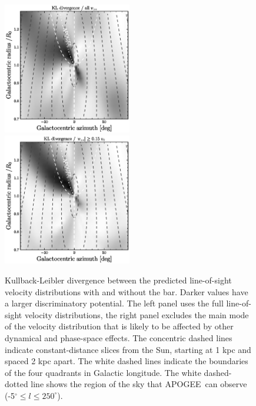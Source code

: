 \documentclass[12pt,preprint]{aastex}
\newcommand{\apogee}{APOGEE}
\begin{document}
\clearpage
\begin{figure}
\includegraphics[width=0.5\textwidth]{detecta.ps}
\includegraphics[width=0.5\textwidth]{detectb.ps}
\caption{Kullback-Leibler divergence between the predicted
  line-of-sight velocity distributions with and without the
  bar. Darker values have a larger discriminatory potential. The left
  panel uses the full line-of-sight velocity distributions, the right
  panel excludes the main mode of the velocity distribution that is
  likely to be affected by other dynamical and phase-space
  effects. The concentric dashed lines indicate constant-distance
  slices from the Sun, starting at 1 kpc and spaced 2 kpc apart.  The
  white dashed lines indicate the boundaries of the four quadrants in
  Galactic longitude.  The white dashed-dotted line shows the region
  of the sky that \apogee\ can observe (-5$^{\circ} \leq l \leq
  250^{\circ}$).}\label{fig:detect}
\end{figure}
\end{document}
